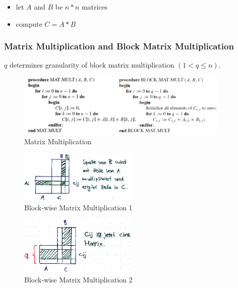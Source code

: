 \begin{itemize}
\tightlist
\item
  let $A$ and $B$ be $n*n$ matrices
\item
  compute $C = A*B$
\end{itemize}

\hypertarget{matrix-multiplication-and-block-matrix-multiplication}{%
\subsubsection{Matrix Multiplication and Block Matrix
Multiplication}\label{matrix-multiplication-and-block-matrix-multiplication}}

$q$ determines granularity of block matrix multiplication $(1 < q \leq n)$.

\begin{figure}[H]
\centering
\includegraphics[width=0.9\textwidth]{figures/matrixMatrixMultiplication1.png}
\caption{Matrix Multiplication}
\end{figure}

\begin{figure}[H]
\centering
\includegraphics[width=0.5\textwidth]{figures/matrix-mult-block1}
\caption{Block-wise Matrix Multiplication 1}
\end{figure}

\begin{figure}[H]
\centering
\includegraphics[width=0.5\textwidth]{figures/matrix-mult-block2}
\caption{Block-wise Matrix Multiplication 2}
\end{figure}

